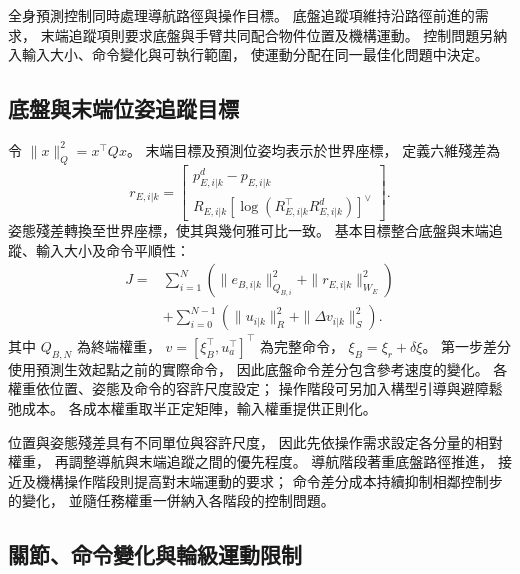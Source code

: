 全身預測控制同時處理導航路徑與操作目標。
底盤追蹤項維持沿路徑前進的需求，
末端追蹤項則要求底盤與手臂共同配合物件位置及機構運動。
控制問題另納入輸入大小、命令變化與可執行範圍，
使運動分配在同一最佳化問題中決定。

\subsection{底盤與末端位姿追蹤目標}
\label{subsec:wholebody_tracking_objective}

令 $\|x\|_Q^2=x^\top Qx$。
末端目標及預測位姿均表示於世界座標，
定義六維殘差為
\begin{equation}
    r_{E,i|k}=
    \begin{bmatrix}
        p_{E,i|k}^{d}-p_{E,i|k}\\
        R_{E,i|k}
        [\log(R_{E,i|k}^{\top}R_{E,i|k}^{d})]^\vee
    \end{bmatrix}.
    \label{eq:ch3_tcp_pose_residual}
\end{equation}
姿態殘差轉換至世界座標，使其與幾何雅可比一致。
基本目標整合底盤與末端追蹤、輸入大小及命令平順性：
\begin{equation}
    \begin{aligned}
        J={}&\sum_{i=1}^{N}
        \left(\|e_{B,i|k}\|_{Q_{B,i}}^2+
              \|r_{E,i|k}\|_{W_E}^2\right)\\
        &+\sum_{i=0}^{N-1}
        \left(\|u_{i|k}\|_R^2+
              \|\Delta v_{i|k}\|_S^2\right).
    \end{aligned}
    \label{eq:ch3_wholebody_objective}
\end{equation}
其中 $Q_{B,N}$ 為終端權重，
$v=[\xi_B^\top,u_a^\top]^\top$ 為完整命令，
$\xi_B=\xi_r+\delta\xi$。
第一步差分使用預測生效起點之前的實際命令，
因此底盤命令差分包含參考速度的變化。
各權重依位置、姿態及命令的容許尺度設定；
操作階段可另加入構型引導與避障鬆弛成本。
各成本權重取半正定矩陣，輸入權重提供正則化。

位置與姿態殘差具有不同單位與容許尺度，
因此先依操作需求設定各分量的相對權重，
再調整導航與末端追蹤之間的優先程度。
導航階段著重底盤路徑推進，
接近及機構操作階段則提高對末端運動的要求；
命令差分成本持續抑制相鄰控制步的變化，
並隨任務權重一併納入各階段的控制問題。

\subsection{關節、命令變化與輪級運動限制}
\label{subsec:joint_command_wheel_constraints}

